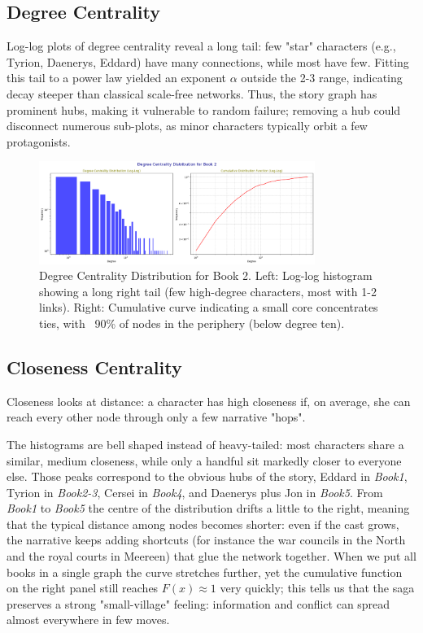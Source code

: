 \documentclass[12pt, a4paper]{article}
\begin{document}
	
	\subsection*{Degree Centrality} 
	Log-log plots of degree centrality reveal a long tail: few "star" characters (e.g., Tyrion, Daenerys, Eddard) have many connections, while most have few. Fitting this tail to a power law yielded an exponent $\alpha$ outside the 2-3 range, indicating decay steeper than classical scale-free networks. Thus, the story graph has prominent hubs, making it vulnerable to random failure; removing a hub could disconnect numerous sub-plots, as minor characters typically orbit a few protagonists.
	\begin{figure}[htbp]
		\centering
		\includegraphics[width=0.8\textwidth]{deg-cent-log-book-2.png}
		\caption{Degree Centrality Distribution for Book 2. Left: Log-log histogram showing a long right tail (few high-degree characters, most with 1-2 links). Right: Cumulative curve indicating a small core concentrates ties, with ~90\% of nodes in the periphery (below degree ten).}
		\label{fig:degcentbook2}
	\end{figure}
      \FloatBarrier
	
	
	\subsection*{Closeness Centrality}
	Closeness looks at distance: a character has high closeness if,
	on average, she can reach every other node through only a few narrative "hops".
	
	
	The histograms are bell shaped instead of heavy-tailed: most characters share a similar, medium closeness, while only a handful sit markedly closer to everyone else.  Those peaks correspond to the obvious hubs of the story, Eddard in \emph{Book1}, Tyrion in \emph{Book2-3}, Cersei in \emph{Book4}, and Daenerys plus Jon in \emph{Book5}.
	From \emph{Book1} to \emph{Book5} the centre of the distribution drifts a little to the right, meaning that the typical distance among nodes becomes shorter: even if the cast grows, the narrative keeps adding shortcuts (for instance the war councils in the North and the royal courts in Meereen) that glue the network together.
	When we put all books in a single graph the curve stretches further, 
	yet the cumulative function on the right panel still reaches $F(x)\approx1$ 
	very quickly; this tells us that the saga preserves a strong "small-village" feeling: 
	information and conflict can spread almost everywhere in  few moves.
	
\end{document}
